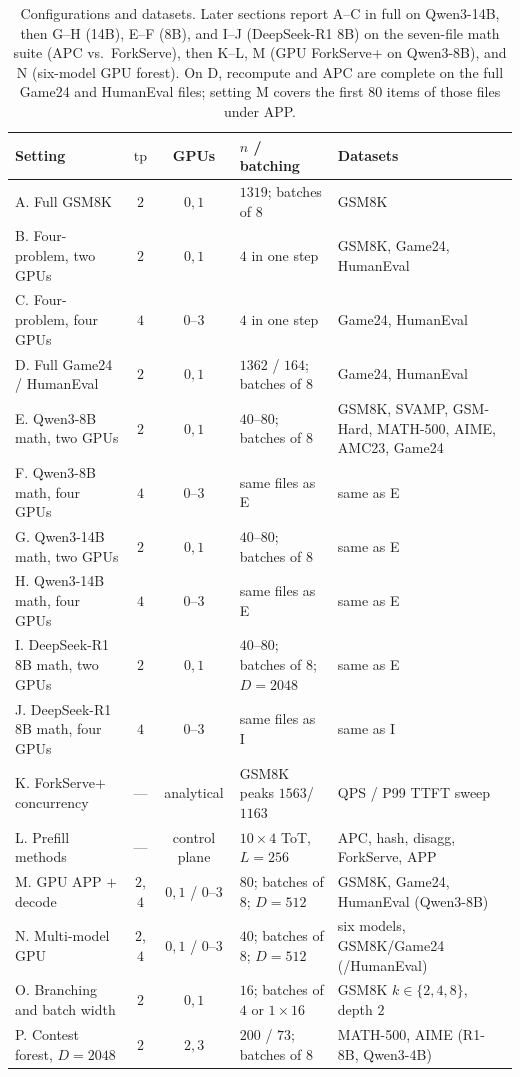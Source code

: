 \documentclass[11pt,a4paper]{article}
\begin{document}
\begin{table}[h]
\centering
\small
\begin{tabular}{@{}>{\raggedright\arraybackslash}p{}
c
c
>{\raggedright\arraybackslash}p{}
>{\raggedright\arraybackslash}p{}@{}}
\toprule
Setting & $\mathrm{tp}$ & GPUs & $n$ / batching & Datasets \\
\midrule
A. Full GSM8K & $2$ & $0,1$ & $1319$; batches of $8$ & GSM8K \\
B. Four-problem, two GPUs & $2$ & $0,1$ & $4$ in one step & GSM8K, Game24, HumanEval \\
C. Four-problem, four GPUs & $4$ & $0$--$3$ & $4$ in one step & Game24, HumanEval \\
D. Full Game24 / HumanEval & $2$ & $0,1$ & $1362$ / $164$; batches of $8$ & Game24, HumanEval \\
E. Qwen3-8B math, two GPUs & $2$ & $0,1$ & $40$--$80$; batches of $8$ & GSM8K, SVAMP, GSM-Hard, MATH-500, AIME, AMC23, Game24 \\
F. Qwen3-8B math, four GPUs & $4$ & $0$--$3$ & same files as E & same as E \\
G. Qwen3-14B math, two GPUs & $2$ & $0,1$ & $40$--$80$; batches of $8$ & same as E \\
H. Qwen3-14B math, four GPUs & $4$ & $0$--$3$ & same files as E & same as E \\
I. DeepSeek-R1 8B math, two GPUs & $2$ & $0,1$ & $40$--$80$; batches of $8$; $D{=}2048$ & same as E \\
J. DeepSeek-R1 8B math, four GPUs & $4$ & $0$--$3$ & same files as I & same as I \\
K. ForkServe+ concurrency & --- & analytical & GSM8K peaks $1563$/$1163$ & QPS / P99 TTFT sweep \\
L. Prefill methods & --- & control plane & $10{\times}4$ ToT, $L{=}256$ & APC, hash, disagg, ForkServe, APP \\
M. GPU APP $+$ decode & $2$, $4$ & $0,1$ / $0$--$3$ & $80$; batches of $8$; $D{=}512$ & GSM8K, Game24, HumanEval (Qwen3-8B) \\
N. Multi-model GPU & $2$, $4$ & $0,1$ / $0$--$3$ & $40$; batches of $8$; $D{=}512$ & six models, GSM8K/Game24 (/HumanEval) \\
O. Branching and batch width & $2$ & $0,1$ & $16$; batches of $4$ or $1{\times}16$ & GSM8K $k\in\{2,4,8\}$, depth $2$ \\
P. Contest forest, $D{=}2048$ & $2$ & $2,3$ & $200$ / $73$; batches of $8$ & MATH-500, AIME (R1-8B, Qwen3-4B) \\
\bottomrule
\end{tabular}
\caption{Configurations and datasets.
Later sections report A--C in full on Qwen3-14B, then G--H (14B), E--F (8B), and I--J (DeepSeek-R1 8B) on the seven-file math suite (APC vs.\ ForkServe), then K--L, M (GPU ForkServe+ on Qwen3-8B), and N (six-model GPU forest).
On D, recompute and APC are complete on the full Game24 and HumanEval files; setting M covers the first $80$ items of those files under APP.}
\end{table}
\end{document}
